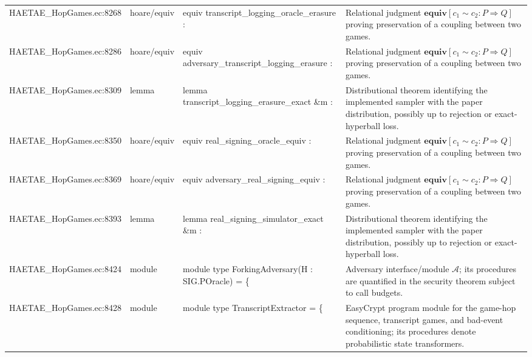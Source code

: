 \documentclass[10pt]{article}
\begin{document}
\begin{longtable}{L{0.11\textwidth}L{0.055\textwidth}L{0.385\textwidth}L{0.41\textwidth}}
HAETAE\_\allowbreak{}HopGames.\allowbreak{}ec:\allowbreak{}8268 & hoare/equiv & {\ttfamily\scriptsize equiv transcript\_\allowbreak{}logging\_\allowbreak{}oracle\_\allowbreak{}erasure :} & Relational judgment $\mathbf{equiv}[c_1\sim c_2:P\Rightarrow Q]$ proving preservation of a coupling between two games. \\
HAETAE\_\allowbreak{}HopGames.\allowbreak{}ec:\allowbreak{}8286 & hoare/equiv & {\ttfamily\scriptsize equiv adversary\_\allowbreak{}transcript\_\allowbreak{}logging\_\allowbreak{}erasure :} & Relational judgment $\mathbf{equiv}[c_1\sim c_2:P\Rightarrow Q]$ proving preservation of a coupling between two games. \\
HAETAE\_\allowbreak{}HopGames.\allowbreak{}ec:\allowbreak{}8309 & lemma & {\ttfamily\scriptsize lemma transcript\_\allowbreak{}logging\_\allowbreak{}erasure\_\allowbreak{}exact \&m :} & Distributional theorem identifying the implemented sampler with the paper distribution, possibly up to rejection or exact-hyperball loss. \\
HAETAE\_\allowbreak{}HopGames.\allowbreak{}ec:\allowbreak{}8350 & hoare/equiv & {\ttfamily\scriptsize equiv real\_\allowbreak{}signing\_\allowbreak{}oracle\_\allowbreak{}equiv :} & Relational judgment $\mathbf{equiv}[c_1\sim c_2:P\Rightarrow Q]$ proving preservation of a coupling between two games. \\
HAETAE\_\allowbreak{}HopGames.\allowbreak{}ec:\allowbreak{}8369 & hoare/equiv & {\ttfamily\scriptsize equiv adversary\_\allowbreak{}real\_\allowbreak{}signing\_\allowbreak{}equiv :} & Relational judgment $\mathbf{equiv}[c_1\sim c_2:P\Rightarrow Q]$ proving preservation of a coupling between two games. \\
HAETAE\_\allowbreak{}HopGames.\allowbreak{}ec:\allowbreak{}8393 & lemma & {\ttfamily\scriptsize lemma real\_\allowbreak{}signing\_\allowbreak{}simulator\_\allowbreak{}exact \&m :} & Distributional theorem identifying the implemented sampler with the paper distribution, possibly up to rejection or exact-hyperball loss. \\
HAETAE\_\allowbreak{}HopGames.\allowbreak{}ec:\allowbreak{}8424 & module & {\ttfamily\scriptsize module type ForkingAdversary(H : SIG.POracle) = \{} & Adversary interface/module $\mathcal A$; its procedures are quantified in the security theorem subject to call budgets. \\
HAETAE\_\allowbreak{}HopGames.\allowbreak{}ec:\allowbreak{}8428 & module & {\ttfamily\scriptsize module type TranscriptExtractor = \{} & EasyCrypt program module for the game-hop sequence, transcript games, and bad-event conditioning; its procedures denote probabilistic state transformers. \\

\end{longtable}
\end{document}
